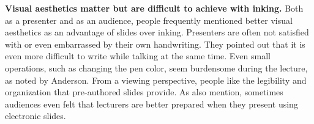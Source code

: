 \textbf{Visual aesthetics matter but are difficult to achieve with inking.} Both as a presenter and as an audience, people frequently mentioned better visual aesthetics as an advantage of slides over inking. Presenters are often not satisfied with or even embarrassed by their own handwriting. They pointed out that it is even more difficult to write while talking at the same time. Even small operations, such as changing the pen color, seem burdensome during the lecture, as noted by Anderson\cite{anderson2004study}. 
%
From a viewing perspective, people like the legibility and organization that pre-authored slides provide. As \cite{frey2002learners} also mention, sometimes audiences even felt that lecturers are better prepared when they present using electronic slides. 
